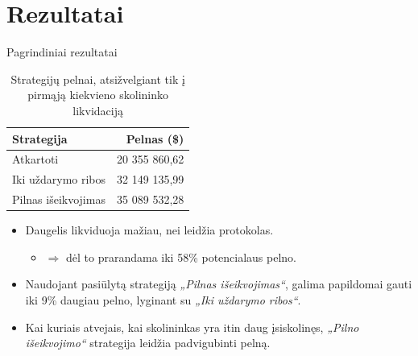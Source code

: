 \documentclass[12pt]{beamer}
\begin{document}
\section{Rezultatai}
\begin{frame}{Pagrindiniai rezultatai}
    \begin{table}[h!]
        \centering
        \label{tab:strategiju_pelnai}
        \begin{tabular}{|l|r|}
        \hline
        \textbf{Strategija}                     & \textbf{Pelnas (\$)} \\ \hline
        Atkartoti                               & 20 355 860,62        \\ \hline
        Iki uždarymo ribos              & 32 149 135,99        \\ \hline
        Pilnas išeikvojimas                           & 35 089 532,28        \\ \hline
        \end{tabular}
        \caption{Strategijų pelnai, atsižvelgiant tik į
        pirmąją kiekvieno skolininko likvidaciją}
    \end{table}
    \begin{itemize}
    \item Daugelis likviduoja mažiau, nei leidžia protokolas. 
        \begin{itemize}
        \item \(\Rightarrow\) dėl to prarandama iki 58\% potencialaus pelno.
        \end{itemize}
    \item Naudojant pasiūlytą strategiją \emph{„Pilnas išeikvojimas“}, galima papildomai gauti iki 9\% daugiau pelno, lyginant su \emph{„Iki uždarymo ribos“}.
    \item Kai kuriais atvejais, kai skolininkas yra itin daug įsiskolinęs, \emph{„Pilno išeikvojimo“} strategija leidžia padvigubinti pelną.
    \end{itemize}
\end{frame}
\end{document}
